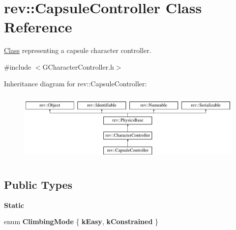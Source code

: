 \hypertarget{classrev_1_1_capsule_controller}{}\section{rev\+::Capsule\+Controller Class Reference}
\label{classrev_1_1_capsule_controller}


\mbox{\hyperlink{struct_class}{Class}} representing a capsule character controller.  




{\ttfamily \#include $<$G\+Character\+Controller.\+h$>$}

Inheritance diagram for rev\+::Capsule\+Controller\+:\begin{figure}[H]
\begin{center}
\leavevmode
\includegraphics[height=3.544304cm]{classrev_1_1_capsule_controller}
\end{center}
\end{figure}
\subsection*{Public Types}
\begin{Indent}\textbf{ Static}\par
\begin{DoxyCompactItemize}
\item 
\mbox{\label{classrev_1_1_capsule_controller_ae84f32dd5807ef003ea7f394f5edab50}} 
enum {\bfseries Climbing\+Mode} \{ {\bfseries k\+Easy}, 
{\bfseries k\+Constrained}
 \}
\end{DoxyCompactItemize}
\end{Indent}
